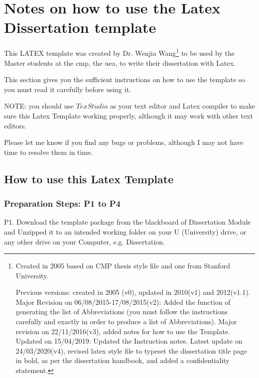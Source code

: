 \def\baselinestretch{1}

\chapter{Notes on how to use the Latex Dissertation template}

\def\baselinestretch{1.66}

This LATEX template was created by Dr. Wenjia Wang\footnote{Created in 2005 based on CMP thesis style file and one from Stanford University. 

Previous versions: created in 2005 (v0), updated in 2010(v1) and 2012(v1.1).  
	Major Revision on 06/08/2015-17/08/2015(v2): Added the function of generating the list of Abbreviations (you must follow the instructions carefully and exactly in order to produce a list of Abbreviations). 
	Major revision on 22/11/2016(v3), added notes for how to use the Template.   
	Updated on 15/04/2019: Updated the Instruction notes.
	Latest update on 24/03/2020(v4), revised latex style file to typeset the dissertation title page in bold, as per the dissertation handbook, and added a confidentiality statement.  
}
 to be used by the Master students at the \gls{cmp}, the \gls{uea}, to write their dissertation with Latex. 

This section gives you the sufficient instructions on how to use the template so you must read it carefully before using it.

NOTE: you should use $TexStudio$ as your text editor and Latex compiler to make sure this Latex Template working properly, although it may work with other text editors.
 
 
Please let me know if you find any bugs or problems, although I may not have time to resolve them in time.
 
 
\section{How to use this Latex Template}
 
\subsection{Preparation Steps: P1 to P4} 
 
P1. Download the template package from the blackboard of Dissertation Module and Unzipped it to an intended working folder on your U (University) drive, or any other drive on your Computer, e.g. Dissertation. 

